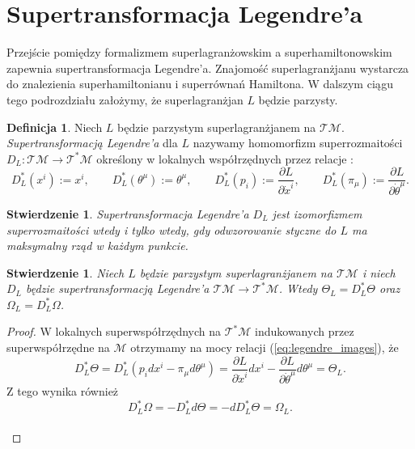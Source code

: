 \documentclass[11pt,a4paper]{report}
\newtheorem{proposition}[theorem]{Stwierdzenie}
\theoremstyle{definition}
\newtheorem{definition}[theorem]{Definicja}
\begin{document}
\section{Supertransformacja Legendre'a}
			      				
Przejście pomiędzy formalizmem superlagranżowskim a superhamiltonowskim zapewnia supertransformacja Legendre'a. Znajomość superlagranżjanu wystarcza do znalezienia superhamiltonianu i superrównań Hamiltona. W dalszym ciągu tego podrozdziału założymy, że superlagranżjan $L$ będzie parzysty.
			      				
\begin{definition}
	Niech $L$ będzie parzystym superlagranżjanem na $\mathcal{TM}$. \textit{Supertransformacją Legendre'a} dla $L$ nazywamy homomorfizm superrozmaitości $D_L: \mathcal{TM} \rightarrow \mathcal{T^*M}$ określony w lokalnych współrzędnych przez relacje \cite{carinena}:
	\begin{equation}
		\label{eq:legendre_images}
		D_L^*(x^i) := x^i, \qquad D_L^*(\theta^\mu) := \theta^\mu, 
		\qquad D_L^*(p_i) := \frac{\partial L}{\partial \dot x^i}, 
		\qquad D_L^*(\pi_\mu) := \frac{\partial L}{\partial \dot \theta^\mu}.
	\end{equation}
\end{definition}
			      				
\begin{proposition}
	Supertransformacja Legendre'a $D_L$ jest izomorfizmem superrozmaitości wtedy i tylko wtedy, gdy odwzorowanie styczne do $L$ ma maksymalny rząd w każdym punkcie.
\end{proposition}
			      				
\begin{proposition}
	Niech $L$ będzie parzystym superlagranżjanem na $\mathcal{TM}$ i niech $D_L$ będzie supertransformacją Legendre'a $\mathcal{TM} \rightarrow \mathcal{T^*M}$. Wtedy $\Theta_L = D^*_L \Theta$ oraz $\Omega_L = D^*_L \Omega$.
\end{proposition}
			      				
\begin{proof}
	W lokalnych superwspółrzędnych na $\mathcal{T^*M}$ indukowanych przez superwspółrzędne na $\mathcal{M}$ otrzymamy na mocy relacji (\ref{eq:legendre_images}), że
	\begin{equation*}
		D^*_L \Theta = D^*_L (p_i dx^i - \pi_\mu d\theta^\mu) = \frac{\partial L}{\partial \dot x^i} dx^i - \frac{\partial L}{\partial \dot \theta^\mu} d\theta^\mu = \Theta_L.
	\end{equation*}
	Z tego wynika również
	\begin{equation*}
		D^*_L \Omega = - D^*_L d \Theta = - d D^*_L \Theta = \Omega_L.
	\end{equation*}\\[-34.5pt]
\end{proof}
			      				
\end{document}
